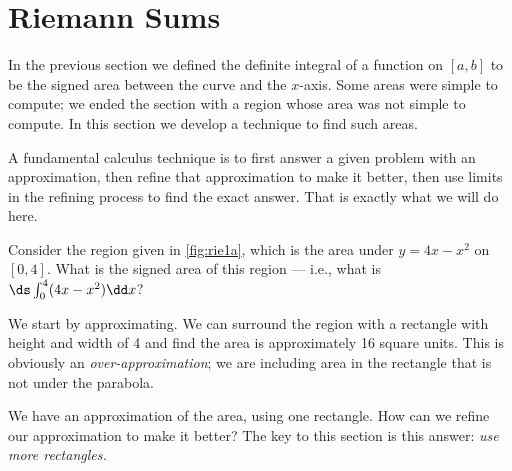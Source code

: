 \section{Riemann Sums}\label{sec:riemann}

In the previous section we defined the definite integral of a function on $[a,b]$ to be the signed area between the curve and the $x$-axis. Some areas were simple to compute; we ended the section with a region whose area was not simple to compute. In this section we develop a technique to find such areas.

A fundamental calculus technique is to first answer a given problem with an approximation, then refine that approximation to make it better, then use limits in the refining process to find the exact answer. That is exactly what we will do here.

Consider the region given in \autoref{fig:rie1a}, which is the area under $y=4x-x^2$ on $[0,4]$. What is the signed area of this region --- i.e., what is $\ds\int_0^4(4x-x^2)\dd x$?


We start by approximating. We can surround the region with a rectangle with height and width of 4 and find the area is approximately 16 square units. This is obviously an \emph{over-approximation}; we are including area in the rectangle that is not under the parabola. 


We have an approximation of the area, using one rectangle. How can we refine our approximation to make it better? The key to this section is this answer: \emph{use more rectangles.}

